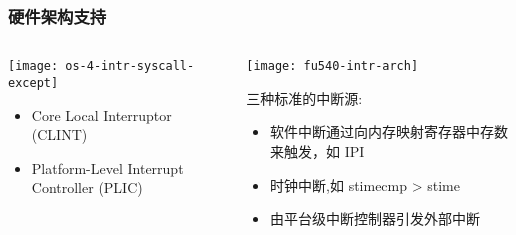 \begin{frame}[plain]
	\frametitle{硬件架构支持}
	\begin{columns}
		
		\begin{column}{0.45\textwidth}
			\centering
			\texttt{[image: os-4-intr-syscall-except]}
			\begin{itemize} \small
				\item Core Local	Interruptor (CLINT)
				\item Platform-Level Interrupt Controller (PLIC)
			\end{itemize}
			
		\end{column}
		
		\begin{column}{0.5\textwidth}
			
			\texttt{[image: fu540-intr-arch]}	
			
			三种标准的中断源:
			\begin{itemize}
				\item 软件中断通过向内存映射寄存器中存数来触发，如 IPI \pause
				\item 时钟中断,如 stimecmp > stime  \pause
				\item 由平台级中断控制器引发外部中断
			\end{itemize}		
			
		\end{column}
		
	\end{columns}
	
\end{frame}



